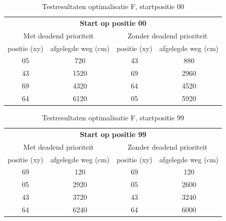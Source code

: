 \documentclass[tt2]{penoverslag}
\begin{document}
\begin{table}[!hb]
\begin{center}
    \begin{tabular}{ c | c || c | c }
    \multicolumn{4}{c}{\textbf{Start op positie 00}} \\ 
   \multicolumn{2}{c||}{Met deadend prioriteit} & \multicolumn{2}{|c}{Zonder deadend prioriteit}\\
     positie (xy) & afgelegde weg (cm) & positie (xy) &  afgelegde weg (cm)\\ \hline\hline
    {\color{green}05} & {\color{green}720} & {\color{green}43} & {\color{green}880} \\ \hline
    {\color{green}43} & {\color{green}1520} & {\color{green}69} & {\color{green}2960} \\ \hline
    {\color{green}69} & {\color{green}4320} & {\color{green}64} & {\color{green}4520} \\ \hline
    {\color{red}64} & {\color{red}6120} & {\color{red}05} & {\color{red}5920}\\
    \end{tabular}
    \caption{Testresultaten optimalisatie F, startpositie 00}
    \label{tab:resultVerken}
\end{center}
\end{table}

\begin{table}[!hb]
\begin{center}
    \begin{tabular}{c | c || c | c }
    \multicolumn{4}{c}{\textbf{Start op positie 99}} \\
   \multicolumn{2}{c||}{Met deadend prioriteit} & \multicolumn{2}{|c}{Zonder deadend prioriteit}\\
     positie (xy) &  afgelegde weg (cm) & positie (xy) &  afgelegde weg (cm)\\ \hline\hline
    69 & 120 & 69 & 120 \\ \hline
    {\color{red}05} & {\color{red}2920} & {\color{red}05} & {\color{red}2600} \\ \hline
    {\color{red}43} & {\color{red}3720} & {\color{red}43} & {\color{red}3240} \\ \hline
    {\color{red}64} & {\color{red}6240} & {\color{red}64} & {\color{red}6000}\\
    \end{tabular}
    \caption{Testresultaten optimalisatie F, startpositie 99}
    \label{tab:resultVerken}
\end{center}
\end{table}
\end{document}

